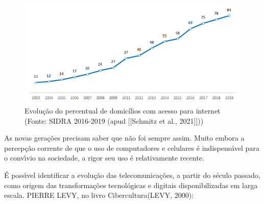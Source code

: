 \documentclass[
12pt,		%
openright,	%
twoside,  %
a4paper,			%
chapter=TITLE,		%
english,			%
french,				%
spanish,			%
brazil				%
]{USPSC-classe/USPSC}
\begin{document}
\captionsetup{format=plain}
\begin{figure}[max size={\textwidth}{\textheight}]

\centering


\begin{minipage}[b]{0.4\linewidth}
        \centering
                \includegraphics[width=1.0\linewidth]{../../imagens/acesso-internet.png}
                \caption{Evolu\c{c}\~ao do percentual de domic\'{i}lios com acesso para internet (Fonte: SIDRA 2016-2019  (apud [[Schmitz et al., 2021]]))}
                \label{dc69b8cf40fae2ba00158e43d2db2d294110957c}
\end{minipage}%
\hspace{0.5cm}
\end{figure}



As novas gera\c{c}\~oes precisam saber que n\~ao foi sempre assim. Muito embora a percep\c{c}\~ao corrente de que o uso de computadores e celulares \'e indispens\'avel para o conv\'{\i}vio na sociedade, a rigor seu uso \'e relativamente recente.








\'E poss\'{\i}vel identificar a evolu\c{c}\~ao das telecomunica\c{c}\~oes, a partir do s\'eculo passado, como origem das transforma\c{c}\~oes tecnol\'ogicas e digitais disponibilizadas em larga escala. PIERRE LEVY, no livro \textquotedbl Cibercultura\textquotedbl  (LEVY, 2000):
\end{document}
